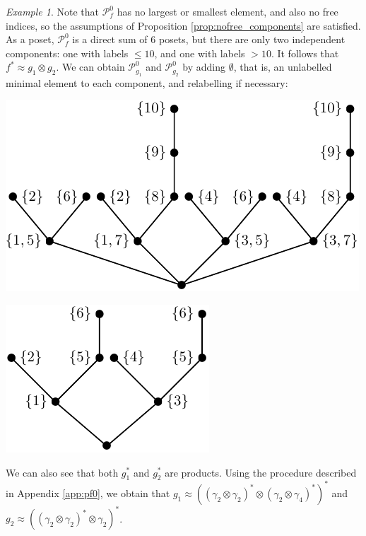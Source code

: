 \documentclass[12pt]{article}
\theoremstyle{definition}
\theoremstyle{remark}
\newtheorem{exm}{Example}
\def\Pe{\mathcal P}
\begin{document}
\begin{exm}
Note that $\Pe_f^0$ has no largest or smallest element, and also no free indices, so the
assumptions of Proposition \ref{prop:nofree_components} are satisfied. As a poset, $\Pe_f^0$  is a direct sum of 6 posets, but there are only two independent
components: one with labels $\le 10$, and one with labels  $>10$. It follows that
$f^*\approx
g_1\otimes g_2$. We can obtain
$\Pe_{g_1}^0$ and $\Pe_{g_2}^0$ by adding $\emptyset$, that is, an unlabelled minimal
element to each component, and relabelling if necessary:
\begin{center}
\begin{minipage}[c]{0.6\textwidth}
\centering
\includegraphics[scale=0.8]{component1.pdf}
\end{minipage}
\begin{minipage}[c]{0.35\textwidth}
\centering
\includegraphics[scale=0.8]{component2.pdf}
\end{minipage}
\end{center}
We can also see that both $g_1^*$ and $g_2^*$ are products. Using the procedure described
in Appendix \ref{app:pf0}, we obtain that $g_1\approx ((\gamma_2\otimes \gamma_2)^*\otimes (\gamma_2\otimes
\gamma_4)^*)^*$ and $g_2\approx ((\gamma_2\otimes\gamma_2)^*\otimes \gamma_2)^*$.




\end{exm}
\end{document}
